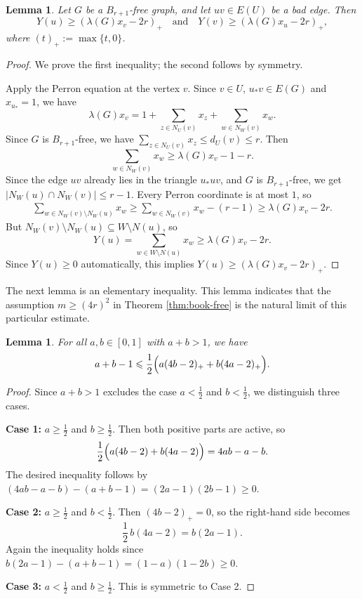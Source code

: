 \documentclass[11pt,a4paper]{article}
\newtheorem{lemma}[theorem]{Lemma}
\theoremstyle{definition}
\theoremstyle{plain}
\renewcommand{\le}{\leqslant}
\renewcommand{\ge}{\geqslant}
\begin{document}
\begin{lemma} \label{lem:Yu-lower}
Let $G$ be a $B_{r+1}$-free graph, and let $uv\in E(U)$ be a bad edge. Then
\[
Y(u)\ge (\lambda(G)x_v-2r)_+
\quad \text{and} \quad 
Y(v)\ge (\lambda(G)x_u-2r)_+,
\]
where $(t)_+:=\max\{t,0\}$.
\end{lemma}

\begin{proof}
We prove the first inequality; the second follows by symmetry.

Apply the Perron equation at the vertex $v$. Since $v\in U$, $u_*v\in E(G)$ and $x_{u_*}=1$, we have
\[
\lambda(G)x_v=1+\sum_{z\in N_U(v)}x_z+\sum_{w\in N_W(v)}x_w.
\]
Since $G$ is $B_{r+1}$-free, we have $\sum_{z\in N_U(v)}x_z\le d_U(v)\le r$. 
Then 
\[
\sum_{w\in N_W(v)}x_w\ge \lambda(G) x_v -1-r.
\]
Since the edge $uv$ already lies in the triangle $u_*uv$, and $G$ is $B_{r+1}$-free, we get $|N_W(u)\cap N_W(v)|\le r-1$. 
Every Perron coordinate is at most $1$, so 
\begin{align*}
\sum_{w\in N_W(v)\setminus N_W(u)}x_w
\ge \sum_{w\in N_W(v)}x_w-(r-1) 
\ge \lambda(G)x_v -2r.
\end{align*}
But $N_W(v)\setminus N_W(u)\subseteq W\setminus N(u)$, so
\[
Y(u)=\sum_{w\in W\setminus N(u)}x_w\ge \lambda(G) x_v-2r.
\]
Since $Y(u)\ge 0$ automatically, this implies
$Y(u)\ge (\lambda(G)x_v-2r)_+$. 
\end{proof}

The next lemma is an elementary inequality. 
This lemma indicates that the assumption $m\ge (4r)^2$ in Theorem \ref{thm:book-free} is the natural limit of this particular estimate. 

\begin{lemma} \label{lem:algebra}
For all $a,b\in[0,1]$ with $a+b>1$, we have 
\[
a+b-1
\le
\frac12\Bigl(a(4b-2)_+ + b(4a-2)_+\Bigr).
\]
\end{lemma}

\begin{proof}
Since $a+b>1$ excludes the case $a<\tfrac12$ and $b<\tfrac12$,  
we distinguish three cases.

\smallskip
\noindent\textbf{Case 1:} $a\ge \tfrac12$ and $b\ge \tfrac12$.
Then both positive parts are active, so
\[
\frac12\Bigl(a(4b-2)+b(4a-2)\Bigr)=4ab-a-b.
\]
The desired inequality follows by $(4ab-a-b)-(a+b-1)=(2a-1)(2b-1)\ge 0$.

\smallskip
\noindent\textbf{Case 2:} $a\ge \tfrac12$ and $b<\tfrac12$.
Then $(4b-2)_+=0$, so the right-hand side becomes
\[
\frac12\,b(4a-2)=b(2a-1).
\]
Again the inequality holds since $b(2a-1)-(a+b-1)=(1-a)(1-2b)\ge 0$.

\smallskip
\noindent\textbf{Case 3:} $a<\tfrac12$ and $b\ge \tfrac12$.
This is symmetric to Case 2.
\end{proof}
\end{document}
